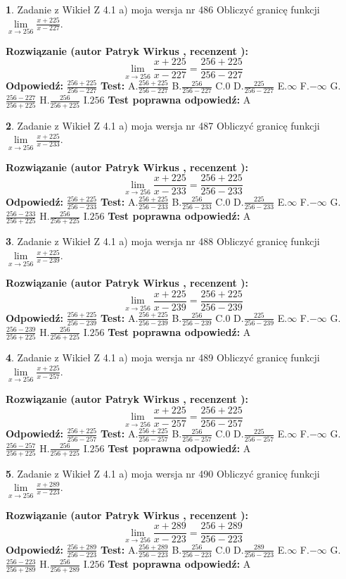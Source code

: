 \documentclass[12pt, a4paper]{article}
\theoremstyle{definition} %
\newtheorem{zad}{}
\newcommand{\zadStart}[1]{\begin{zad}#1\newline}
\newcommand{\zadStop}{\end{zad}}
\newcommand{\rozwStart}[2]{\noindent \textbf{Rozwiązanie (autor #1 , recenzent #2): }\newline}
\newcommand{\rozwStop}{\newline}
\newcommand{\odpStart}{\noindent \textbf{Odpowiedź:}\newline}
\newcommand{\odpStop}{\newline}
\newcommand{\testStart}{\noindent \textbf{Test:}\newline}
\newcommand{\testStop}{\newline}
\newcommand{\kluczStart}{\noindent \textbf{Test poprawna odpowiedź:}\newline}
\newcommand{\kluczStop}{\newline}
\begin{document}
\zadStart{Zadanie z Wikieł Z 4.1 a) moja wersja nr 486}
Obliczyć granicę funkcji $\lim\limits_{x\to256}\frac{x+225}{x-227}$.
\zadStop
\rozwStart{Patryk Wirkus}{}
$$\lim\limits_{x\to256}\frac{x+225}{x-227} = \frac{256+225}{256-227}$$
\rozwStop
\odpStart
$\frac{256+225}{256-227}$
\odpStop
\testStart
A.$\frac{256+225}{256-227}$
B.$\frac{256}{256-227}$
C.$0$
D.$\frac{225}{256-227}$
E.$\infty$
F.$-\infty$
G.$\frac{256-227}{256+225}$
H.$\frac{256}{256+225}$
I.$256$
\testStop
\kluczStart
A
\kluczStop



\zadStart{Zadanie z Wikieł Z 4.1 a) moja wersja nr 487}
Obliczyć granicę funkcji $\lim\limits_{x\to256}\frac{x+225}{x-233}$.
\zadStop
\rozwStart{Patryk Wirkus}{}
$$\lim\limits_{x\to256}\frac{x+225}{x-233} = \frac{256+225}{256-233}$$
\rozwStop
\odpStart
$\frac{256+225}{256-233}$
\odpStop
\testStart
A.$\frac{256+225}{256-233}$
B.$\frac{256}{256-233}$
C.$0$
D.$\frac{225}{256-233}$
E.$\infty$
F.$-\infty$
G.$\frac{256-233}{256+225}$
H.$\frac{256}{256+225}$
I.$256$
\testStop
\kluczStart
A
\kluczStop



\zadStart{Zadanie z Wikieł Z 4.1 a) moja wersja nr 488}
Obliczyć granicę funkcji $\lim\limits_{x\to256}\frac{x+225}{x-239}$.
\zadStop
\rozwStart{Patryk Wirkus}{}
$$\lim\limits_{x\to256}\frac{x+225}{x-239} = \frac{256+225}{256-239}$$
\rozwStop
\odpStart
$\frac{256+225}{256-239}$
\odpStop
\testStart
A.$\frac{256+225}{256-239}$
B.$\frac{256}{256-239}$
C.$0$
D.$\frac{225}{256-239}$
E.$\infty$
F.$-\infty$
G.$\frac{256-239}{256+225}$
H.$\frac{256}{256+225}$
I.$256$
\testStop
\kluczStart
A
\kluczStop



\zadStart{Zadanie z Wikieł Z 4.1 a) moja wersja nr 489}
Obliczyć granicę funkcji $\lim\limits_{x\to256}\frac{x+225}{x-257}$.
\zadStop
\rozwStart{Patryk Wirkus}{}
$$\lim\limits_{x\to256}\frac{x+225}{x-257} = \frac{256+225}{256-257}$$
\rozwStop
\odpStart
$\frac{256+225}{256-257}$
\odpStop
\testStart
A.$\frac{256+225}{256-257}$
B.$\frac{256}{256-257}$
C.$0$
D.$\frac{225}{256-257}$
E.$\infty$
F.$-\infty$
G.$\frac{256-257}{256+225}$
H.$\frac{256}{256+225}$
I.$256$
\testStop
\kluczStart
A
\kluczStop



\zadStart{Zadanie z Wikieł Z 4.1 a) moja wersja nr 490}
Obliczyć granicę funkcji $\lim\limits_{x\to256}\frac{x+289}{x-223}$.
\zadStop
\rozwStart{Patryk Wirkus}{}
$$\lim\limits_{x\to256}\frac{x+289}{x-223} = \frac{256+289}{256-223}$$
\rozwStop
\odpStart
$\frac{256+289}{256-223}$
\odpStop
\testStart
A.$\frac{256+289}{256-223}$
B.$\frac{256}{256-223}$
C.$0$
D.$\frac{289}{256-223}$
E.$\infty$
F.$-\infty$
G.$\frac{256-223}{256+289}$
H.$\frac{256}{256+289}$
I.$256$
\testStop
\kluczStart
A
\kluczStop
\end{document}
